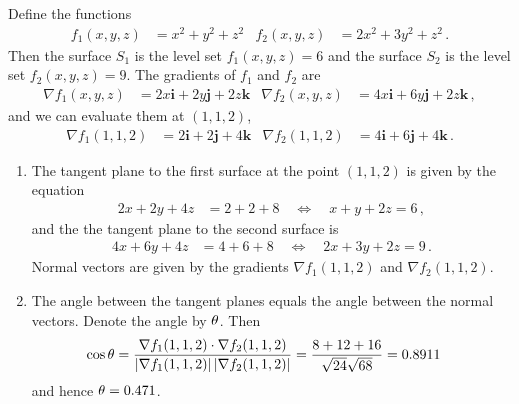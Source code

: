 \begin{solution}
Define the functions
\begin{align*}
f_1(x,y,z) &= x^2 + y^2 + z^2 &
f_2(x,y,z) &= 2x^2 + 3y^2 +z^2\,.
\end{align*}
Then the surface $S_1$ is the level set $f_1(x,y,z) = 6$ and the surface $S_2$ is the level set $f_2(x,y,z) = 9$. The gradients of $f_1$ and $f_2$ are
\begin{align*}
\nabla f_1(x,y,z) &= 2x \mathbf i + 2y \mathbf j + 2z \mathbf k &
\nabla f_2(x,y,z) &= 4x \mathbf i + 6y \mathbf j + 2z \mathbf k\,,
\end{align*}
and we can evaluate them at $(1,1,2)$,
\begin{align*}
\nabla f_1(1,1,2) &= 2 \mathbf i + 2 \mathbf j + 4 \mathbf k &
\nabla f_2(1,1,2) &= 4 \mathbf i + 6 \mathbf j + 4 \mathbf k\,.
\end{align*}

\begin{enumerate}
\item
The tangent plane to the first surface at the point $(1,1,2)$ is given by the equation
\begin{align*}
2x + 2y + 4z &= 2 + 2 + 8
\quad\Leftrightarrow\quad
x + y + 2z = 6\,,
\end{align*}
and the the tangent plane to the second surface is
\begin{align*}
4x + 6y + 4z &= 4 + 6 + 8
\quad\Leftrightarrow\quad
2x + 3y + 2z = 9\,.
\end{align*}
Normal vectors are given by the gradients $\nabla f_1(1,1,2)$ and $\nabla f_2(1,1,2)$.

\item
The angle between the tangent planes equals the angle between the normal vectors. Denote the angle by $\theta$. Then
\begin{align*}
\cos \theta &= \frac{\nabla f_1(1,1,2) \cdot \nabla f_2(1,1,2)}{\left| \nabla f_1(1,1,2)\right| \left| \nabla f_2(1,1,2)\right|}
= \frac{8 + 12 + 16}{\sqrt{24}\sqrt{68}}
= 0.8911\,
\end{align*}
and hence $\theta = 0.471$.


\end{enumerate}
\end{solution}
